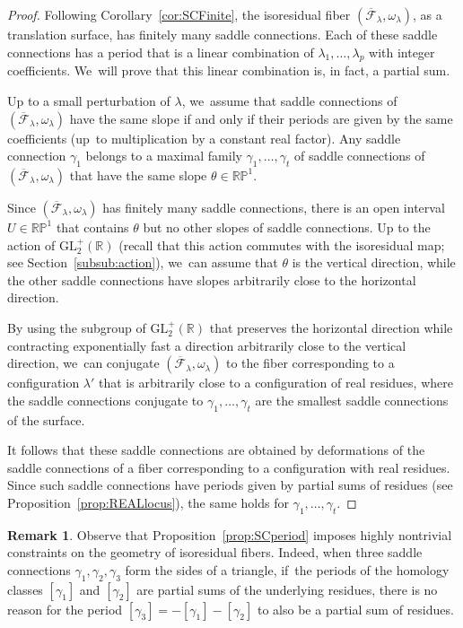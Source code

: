 \documentclass[JEP,XML,SOM,Unicode,NoFloatCountersInSection,published]{cedram}
\theoremstyle{definition}
\newtheorem{rmk}[thm]{Remark}
\begin{document}
\begin{proof}
Following Corollary~\ref{cor:SCFinite}, the isoresidual fiber $(\overline{\mathcal{F}}_{\lambda},\omega_{\lambda})$, as a translation surface, has finitely many saddle connections. Each of these saddle connections has a period that is a linear combination of $\lambda_{1},\dots,\lambda_{p}$ with integer coefficients. We~will prove that this linear combination is, in fact, a partial sum.

Up to a small perturbation of $\lambda$, we~assume that saddle connections of $(\overline{\mathcal{F}}_{\lambda},\omega_{\lambda})$ have the same slope if and only if their periods are given by the same coefficients (up~to multiplication by a constant real factor). Any saddle connection $\gamma_{1}$ belongs to a maximal family $\gamma_{1},\dots,\gamma_{t}$ of saddle connections of $(\overline{\mathcal{F}}_{\lambda},\omega_{\lambda})$ that have the same slope $\theta \in \mathbb{RP}^{1}$.

Since $(\overline{\mathcal{F}}_{\lambda},\omega_{\lambda})$ has finitely many saddle connections, there is an open interval $U \in \mathbb{RP}^{1}$ that contains $\theta$ but no other slopes of saddle connections. Up to the action of $\mathrm{GL}_{2}^{+}(\mathbb{R})$ (recall that this action commutes with the isoresidual map; see Section~\ref{subsub:action}), we~can assume that $\theta$ is the vertical direction, while the other saddle connections have slopes arbitrarily close to the horizontal direction.

By using the subgroup of $\mathrm{GL}_{2}^{+}(\mathbb{R})$ that preserves the horizontal direction while contracting exponentially fast a direction arbitrarily close to the vertical direction, we~can conjugate $(\overline{\mathcal{F}}_{\lambda},\omega_{\lambda})$ to the fiber corresponding to a configuration $\lambda'$ that is arbitrarily close to a configuration of real residues, where the saddle connections conjugate to $\gamma_{1},\dots,\gamma_{t}$ are the smallest saddle connections of the surface.

It follows that these saddle connections are obtained by deformations of the saddle connections of a fiber corresponding to a configuration with real residues. Since such saddle connections have periods given by partial sums of residues (see Proposition~\ref{prop:REALlocus}), the same holds for $\gamma_{1},\dots,\gamma_{t}$.
\end{proof}

\begin{rmk}
Observe that Proposition~\ref{prop:SCperiod} imposes highly nontrivial constraints on the geometry of isoresidual fibers. Indeed, when three saddle connections $\gamma_{1},\gamma_{2},\gamma_{3}$ form the sides of a triangle, if~the periods of the homology classes $[\gamma_{1}]$ and $[\gamma_{2}]$ are partial sums of the underlying residues, there is no reason for the period $[\gamma_{3}]=-[\gamma_{1}]-[\gamma_{2}]$ to also be a partial sum of residues.
\end{rmk}
\end{document}
